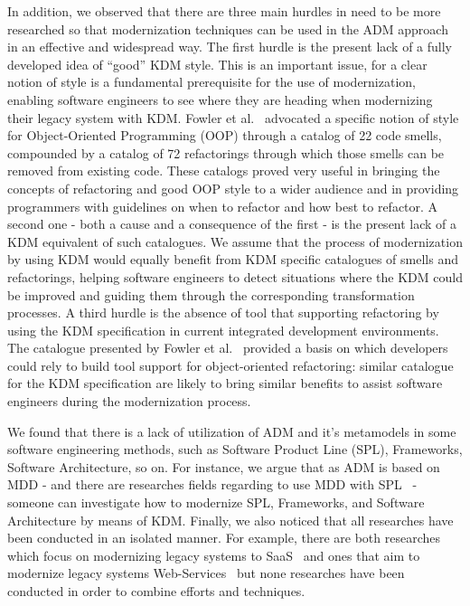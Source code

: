 In addition, we observed that there are three main hurdles in need to be more researched so that modernization techniques can be used in the ADM approach in an effective and widespread way. The first hurdle is the present lack of a fully developed idea of ``good'' KDM style. This is an important issue, for a clear notion of style is a fundamental prerequisite for the use of modernization, enabling software engineers to see where they are heading when modernizing their legacy system with KDM. Fowler et al.~\cite{refactImpro} advocated a specific notion of style for Object-Oriented Programming (OOP) through a catalog of 22 code smells, compounded by a catalog of 72 refactorings through which those smells can be removed from existing code. These catalogs proved very useful in bringing the concepts of refactoring and good OOP style to a wider audience and in providing programmers with guidelines on when to refactor and how best to refactor. A second one - both a cause and a consequence of the first - is the present lack of a KDM equivalent of such catalogues. We assume that the process of modernization by using KDM would equally benefit from KDM specific catalogues of smells and refactorings, helping software engineers to detect situations where the KDM could be improved and guiding them through the corresponding transformation processes. A third hurdle is the absence of tool that supporting refactoring by using the KDM specification in current integrated development environments. The catalogue presented by Fowler et al.~\cite{refactImpro} provided a basis on which developers could rely to build tool support for object-oriented refactoring: similar catalogue for the KDM specification are likely to bring similar benefits to assist software engineers during the modernization process.

We found that there is a lack of utilization of ADM and it's metamodels in some software engineering methods, such as Software Product Line (SPL), Frameworks, Software Architecture, so on. For instance, we argue that as ADM is based on MDD - and there are researches fields regarding to use MDD with SPL~\cite{4335247} - someone can investigate how to modernize SPL, Frameworks, and Software Architecture by means of KDM. Finally, we also noticed that all researches have been conducted in an isolated manner. For example, there are both researches which focus on modernizing legacy systems to SaaS~\cite{5741334, SMR:SMR582} and ones that aim to modernize legacy systems Web-Services~\cite{delCastillo:2009:PRP:1529282.1529753, ICEISPerez:CastilloGCP12} but none researches have been conducted in order to combine efforts and techniques.